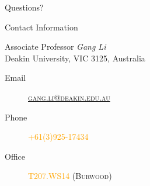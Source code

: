 \documentclass[
 size=14pt,
 paper=smartboard,  %
 mode=present, 		%
 display=slides, 	%
 style=tuliplab,  	%
 pauseslide,
 fleqn,leqno]{powerdot}
\begin{document}
% 
\begin{slide}[toc=,bm=]{Questions?}



\end{slide}


\begin{wideslide}[toc=,bm=]{Contact Information}
\centering
{}
\twocolumn[
lcolwidth=0.35\linewidth,
rcolwidth=0.65\linewidth
]
{
}
{
Associate Professor \emph{Gang Li}\\
Deakin University, VIC 3125, Australia
\begin{description}
 \item[Email] \href{mailto:gang.li@deakin.edu.au}
 {\textsc{\footnotesize{gang.li@deakin.edu.au}}}

 \item[Phone] 
 {\textsc{\footnotesize{\textcolor{orange}{+61(3)925-17434}}}}
 
 \item[Office]
 {\textsc{\footnotesize{\textcolor{orange}{T207.WS14} (Burwood)}}}
\end{description}
}
\end{wideslide}
\end{document}
